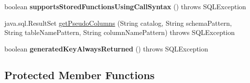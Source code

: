 \begin{DoxyCompactItemize}
boolean {\bfseries supports\+Stored\+Functions\+Using\+Call\+Syntax} ()  throws S\+Q\+L\+Exception 
\item 
java.\+sql.\+Result\+Set \mbox{\hyperlink{classcom_1_1mysql_1_1jdbc_1_1_database_meta_data_a9cdbe72df4ae77a8d088457c4fa53e28}{get\+Pseudo\+Columns}} (String catalog, String schema\+Pattern, String table\+Name\+Pattern, String column\+Name\+Pattern)  throws S\+Q\+L\+Exception 
\item 
\mbox{\label{classcom_1_1mysql_1_1jdbc_1_1_database_meta_data_a2590d733db01e59d54bd708d1242babb}} 
boolean {\bfseries generated\+Key\+Always\+Returned} ()  throws S\+Q\+L\+Exception 
\end{DoxyCompactItemize}
\subsection*{Protected Member Functions}
